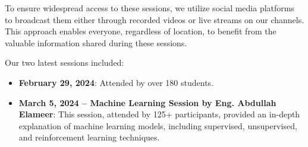\documentclass[a4paper,12pt]{article}
\begin{document}
To ensure widespread access to these sessions, we utilize social media platforms to broadcast them either through recorded videos or live streams on our channels. This approach enables everyone, regardless of location, to benefit from the valuable information shared during these sessions.

Our two latest sessions included:
\begin{itemize}
    \item \textbf{February 29, 2024}: Attended by over 180 students.
    \item \textbf{March 5, 2024 – Machine Learning Session by Eng. Abdullah Elameer}: This session, attended by 125+ participants, provided an in-depth explanation of machine learning models, including supervised, unsupervised, and reinforcement learning techniques.
\end{itemize}
\end{document}
